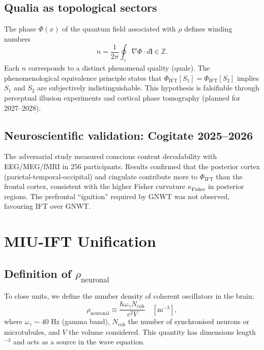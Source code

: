 \documentclass[12pt, a4paper]{article}
\theoremstyle{miuThm}
\theoremstyle{remark}
\begin{document}
\subsection{Qualia as topological sectors}
The phase $\Phi(x)$ of the quantum field associated with $\rho$ defines winding numbers
\begin{equation}
n = \frac{1}{2\pi} \oint_\gamma \nabla\Phi \cdot d\mathbf{l} \in \mathbb{Z}.
\end{equation}
Each $n$ corresponds to a distinct phenomenal quality (quale). The phenomenological equivalence principle states that $\Phi_{\text{IFT}}[S_1] = \Phi_{\text{IFT}}[S_2]$ implies $S_1$ and $S_2$ are subjectively indistinguishable. This hypothesis is falsifiable through perceptual illusion experiments and cortical phase tomography (planned for 2027--2028).


\subsection{Neuroscientific validation: Cogitate 2025--2026}
\label{subsec:cogitate}
The adversarial study \cite{Cogitate2026} measured conscious content decodability
with EEG/MEG/fMRI in 256 participants. Results confirmed that the posterior cortex
(parietal-temporal-occipital) and cingulate contribute more to $\Phi_{\text{IFT}}$
than the frontal cortex, consistent with the higher Fisher curvature
$\kappa_{\text{Fisher}}$ in posterior regions. The prefrontal ``ignition''
required by GNWT was not observed, favouring IFT over GNWT.

\clearpage
\section{MIU-IFT Unification}
\label{sec:unificacion}

\subsection{Definition of $\rho_{\text{neuronal}}$}
To close units, we define the number density of coherent oscillators in the brain:
\begin{equation}
\rho_{\text{neuronal}} \equiv \frac{\hbar \omega_\gamma N_{\text{coh}}}{c^2 V} \quad [\text{m}^{-3}],
\end{equation}
where $\omega_\gamma \sim 40$ Hz (gamma band), $N_{\text{coh}}$ the number of synchronised neurons or microtubules, and $V$ the volume considered. This quantity has dimensions length$^{-3}$ and acts as a source in the wave equation.
\end{document}
